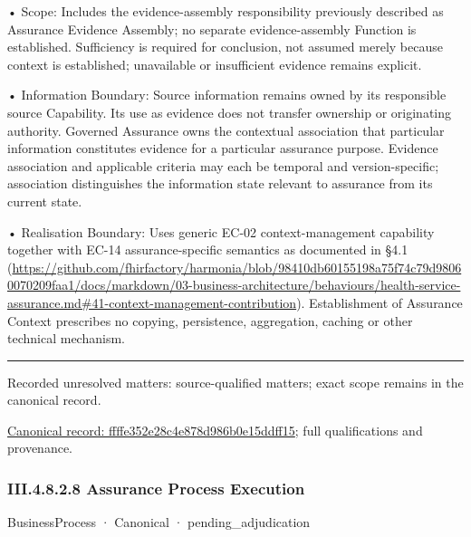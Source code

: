 •
Scope: Includes the evidence-assembly responsibility previously described as Assurance Evidence Assembly; no separate evidence-assembly Function is established. Sufficiency is required for conclusion, not assumed merely because context is established; unavailable or insufficient evidence remains explicit.



•
Information Boundary: Source information remains owned by its responsible source Capability. Its use as evidence does not transfer ownership or originating authority. Governed Assurance owns the contextual association that particular information constitutes evidence for a particular assurance purpose. Evidence association and applicable criteria may each be temporal and version-specific; association distinguishes the information state relevant to assurance from its current state.



•
Realisation Boundary: Uses generic EC-02 context-management capability together with EC-14 assurance-specific semantics as documented in §4.1 (\url{https://github.com/fhirfactory/harmonia/blob/98410db60155198a75f74c79d98060070209faa1/docs/markdown/03-business-architecture/behaviours/health-service-assurance.md#41-context-management-contribution}). Establishment of Assurance Context prescribes no copying, persistence, aggregation, caching or other technical mechanism.



\medskip\hrule\medskip

{\small Recorded unresolved matters: source-qualified matters; exact scope remains in the canonical record.}\par
{\footnotesize \href{../../../../../../../../continuum/business/business-function/ffffe352e28c4e878d986b0e15ddff15.md}{Canonical record: ffffe352e28c4e878d986b0e15ddff15}; full qualifications and provenance.}\par
\subsubsection*{III.4.8.2.8 Assurance Process Execution}
\label{navigation:III.4.8.2.8}

\label{element:3c67e57403b041bb8ccdaf3980b6ff94}
{\small BusinessProcess · Canonical · pending\_adjudication}\par

